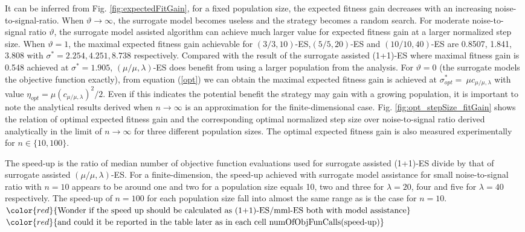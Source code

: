 It can be inferred from Fig. \ref{fig:expectedFitGain}, for a fixed population size, the expected fitness gain decreases with an increasing noise-to-signal-ratio. When $\vartheta \rightarrow \infty$, the surrogate model becomes useless and the strategy becomes a random search. For moderate noise-to-signal ratio $\vartheta$, the surrogate model assisted algorithm can achieve much larger value for expected fitness gain at a larger normalized step size. When $\vartheta = 1$, the maximal expected fitness gain achievable for $(3/3,10)$-ES,$(5/5,20)$-ES and $(10/10,40)$-ES are 0.8507, 1.841, 3.808 with $\sigma^*=2.254,4.251,8.738$ respectively. Compared with the result of the surrogate assisted (1+1)-ES \cite{DBLP:conf/ppsn/KayhaniA18} where maximal fitness gain is 0.548 achieved at $\sigma^* = 1.905$, $(\mu/\mu,\lambda)$-ES does benefit from using a larger population from the analysis. For $\vartheta=0$ (the surrogate models the objective function exactly), from equation (\ref{opt}) we can obtain the maximal expected fitness gain is achieved at $\sigma^*_{opt} = \ \mu c_{\mu / \mu, \lambda}$ with value $\eta_{opt} =  \mu (c_{\mu / \mu, \lambda})^2/2$. Even if this indicates the potential benefit the strategy may gain with a growing population, it is important to note the analytical results derived when $n \rightarrow \infty$ is an approximation for the finite-dimensional case. Fig. \ref{fig:opt_stepSize_fitGain} shows the relation of optimal expected fitness gain and the corresponding optimal normalized step size over noise-to-signal ratio derived analytically in the limit of $n \rightarrow \infty$ for three different population sizes. The optimal expected fitness gain is also measured experimentally for $n \in \{10,100 \}$. 

The speed-up is the ratio of median number of objective function evaluations used for surrogate assisted (1+1)-ES divide by that of surrogate assisted $(\mu/\mu,\lambda)$-ES. For a finite-dimension, the speed-up achieved with surrogate model assistance for small noise-to-signal ratio with $n=10$ appears to be around one and two for a population size equals 10, two and three for $\lambda = 20$, four and five for $\lambda=40$ respectively. The speed-up of $n=100$ for each population size fall into almost the same range as is the case for $n=10$.  
$\color{red}{\text{Wonder if the speed up should be calculated as (1+1)-ES/mml-ES both with model assistance}}$ $ \color{red}{\text{and could it be reported in the table later as in each cell numOfObjFunCalls(speed-up)}}$

